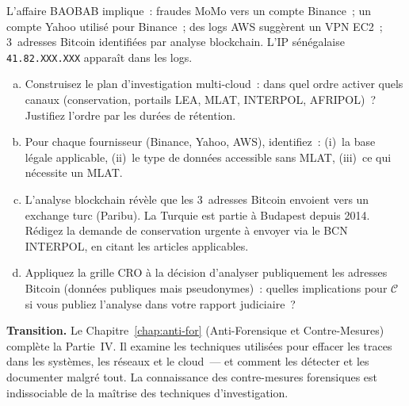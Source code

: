 \begin{boxexo}[title={\ding{45}\quad Exercice~17.3 --- Plan d'investigation multi-cloud \niveauexpert}]
L'affaire BAOBAB implique~: fraudes MoMo vers un compte Binance~;
un compte Yahoo utilisé pour Binance~; des logs AWS suggèrent un VPN
EC2~; 3~adresses Bitcoin identifiées par analyse blockchain.
L'IP sénégalaise \texttt{41.82.XXX.XXX} apparaît dans les logs.
\begin{enumerate}[(a)]
    \item Construisez le plan d'investigation multi-cloud~: dans quel
          ordre activer quels canaux (conservation, portails LEA, MLAT,
          INTERPOL, AFRIPOL)~? Justifiez l'ordre par les durées de
          rétention.
    \item Pour chaque fournisseur (Binance, Yahoo, AWS), identifiez~:
          (i)~la base légale applicable, (ii)~le type de données
          accessible sans MLAT, (iii)~ce qui nécessite un MLAT.
    \item L'analyse blockchain révèle que les 3~adresses Bitcoin
          envoient vers un exchange turc (Paribu). La Turquie est
          partie à Budapest depuis 2014. Rédigez la demande de
          conservation urgente à envoyer via le BCN INTERPOL, en
          citant les articles applicables.
    \item Appliquez la grille CRO à la décision d'analyser publiquement
          les adresses Bitcoin (données publiques mais pseudonymes)~:
          quelles implications pour $\mathcal{C}$ si vous publiez
          l'analyse dans votre rapport judiciaire~?
\end{enumerate}
\end{boxexo}

\bigskip

\begin{boxinfo}
\textbf{Transition.} Le Chapitre~\ref{chap:anti-for} (Anti-Forensique
et Contre-Mesures) complète la Partie~IV. Il examine les techniques
utilisées pour effacer les traces dans les systèmes, les réseaux
et le cloud~--- et comment les détecter et les documenter malgré tout.
La connaissance des contre-mesures forensiques est indissociable
de la maîtrise des techniques d'investigation.
\end{boxinfo}
